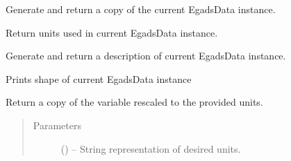 \documentclass[a4paper,10pt,openany,english]{sphinxmanual}
\begin{document}
\begin{fulllineitems}
\begin{quote}
\begin{description}
\begin{itemize}
\end{itemize}

\end{description}\end{quote}

\begin{fulllineitems}
\label{egadsapi:egads.core.egads_core.EgadsData.copy}
Generate and return a copy of the current EgadsData instance.

\end{fulllineitems}


\begin{fulllineitems}
\label{egadsapi:egads.core.egads_core.EgadsData.get_units}
Return units used in current EgadsData instance.

\end{fulllineitems}


\begin{fulllineitems}
\label{egadsapi:egads.core.egads_core.EgadsData.print_description}
Generate and return a description of current EgadsData instance.

\end{fulllineitems}


\begin{fulllineitems}
\label{egadsapi:egads.core.egads_core.EgadsData.print_shape}
Prints shape of current EgadsData instance

\end{fulllineitems}


\begin{fulllineitems}
\label{egadsapi:egads.core.egads_core.EgadsData.rescale}
Return a copy of the variable rescaled to the provided units.
\begin{quote}\begin{description}
\item[{Parameters}] \leavevmode
{} () -- String representation of desired units.

\end{description}\end{quote}

\end{fulllineitems}


\end{fulllineitems}
\end{document}

